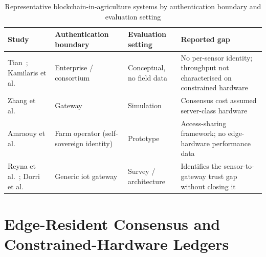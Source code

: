 \documentclass[12pt,a4paper,oneside]{book}
\begin{document}
\begin{table}[htbp]
\centering
\caption{Representative blockchain-in-agriculture systems by authentication
         boundary and evaluation setting}
\label{tab:lit-blockchain-ag}
\footnotesize
\begin{tabularx}{\textwidth}{@{}p{}p{}p{}X@{}}
\toprule
\textbf{Study} & \textbf{Authentication boundary} & \textbf{Evaluation setting} & \textbf{Reported gap} \\
\midrule
Tian~\cite{tian2016agri}; Kamilaris et al.~\cite{kamilaris2019rise}
  & Enterprise / consortium & Conceptual, no field data
  & No per-sensor identity; throughput not characterised on constrained hardware \\
\midrule
Zhang et al.~\cite{zhang2019blockchain}
  & Gateway & Simulation
  & Consensus cost assumed server-class hardware \\
\midrule
Amraouy et al.~\cite{amraouy2025ssi}
  & Farm operator (self-sovereign identity)
  & Prototype
  & Access-sharing framework; no edge-hardware performance data \\
\midrule
Reyna et al.~\cite{reyna2018blockchain}; Dorri et al.~\cite{dorri2017blockchain}
  & Generic \gls{iot} gateway & Survey / architecture
  & Identifies the sensor-to-gateway trust gap without closing it \\
\bottomrule
\end{tabularx}
\end{table}

\section{Edge-Resident Consensus and Constrained-Hardware Ledgers}
\label{subsec:lit_consensus}
\end{document}

